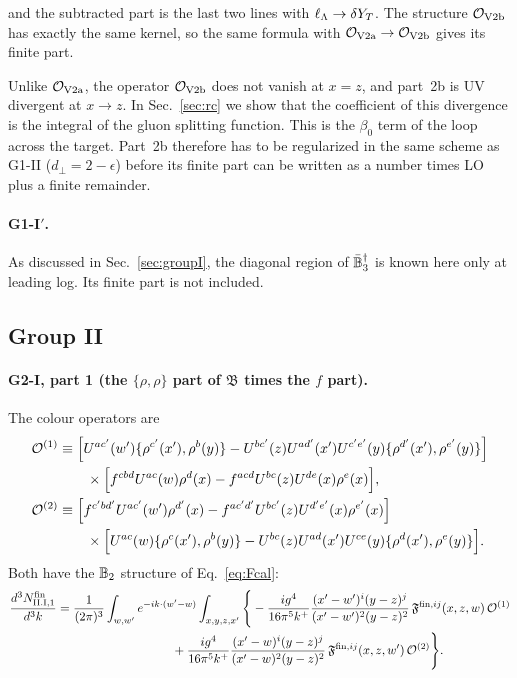 and the subtracted part is the last two lines with $\ell_{\Lambda}\to\delta Y_T$. The structure $\mathcal{O}_{\rm V2b}$ has exactly the same kernel, so the same formula with $\mathcal{O}_{\rm V2a}\to\mathcal{O}_{\rm V2b}$ gives its finite part.

Unlike $\mathcal{O}_{\rm V2a}$, the operator $\mathcal{O}_{\rm V2b}$ does not vanish at $x=z$, and part~2b is UV divergent at $x\to z$. In Sec.~\ref{sec:rc} we show that the coefficient of this divergence is the integral of the gluon splitting function. This is the $\beta_0$ term of the loop across the target. Part~2b therefore has to be regularized in the same scheme as G1-II ($d_\perp=2-\epsilon$) before its finite part can be written as a number times LO plus a finite remainder.

\paragraph*{G1-I$'$.} As discussed in Sec.~\ref{sec:groupI}, the diagonal region of $\bar{\mathbb{B}}_3^\dagger$ is known here only at leading log. Its finite part is not included.

\subsection{Group II}\label{sec:finiteG2}

\paragraph*{G2-I, part 1 (the $\{\rho,\rho\}$ part of $\mathfrak B$ times the $f$ part).} The colour operators are
\begin{align}
\mathcal{O}^{(1)}&\equiv\Big[U^{ac'}(w')\{\rho^{c'}(x'),\rho^b(y)\}-U^{bc'}(z)U^{ad'}(x')U^{c'e'}(y)\{\rho^{d'}(x'),\rho^{e'}(y)\}\Big]\notag\\
&\qquad\times\Big[f^{cbd}U^{ac}(w)\rho^d(x)-f^{acd}U^{bc}(z)U^{de}(x)\rho^e(x)\Big],\notag\\
\mathcal{O}^{(2)}&\equiv\Big[f^{c'bd'}U^{ac'}(w')\rho^{d'}(x)-f^{ac'd'}U^{bc'}(z)U^{d'e'}(x)\rho^{e'}(x)\Big]\notag\\
&\qquad\times\Big[U^{ac}(w)\{\rho^c(x'),\rho^b(y)\}-U^{bc}(z)U^{ad}(x')U^{ce}(y)\{\rho^d(x'),\rho^e(y)\}\Big].
\end{align}
Both have the $\mathbb{B}_2$ structure of Eq.~\eqref{eq:Fcal}:
\begin{align}
\frac{d^3N^{\rm fin}_{\rm II.I,1}}{d^3k}={}&\frac{1}{(2\pi)^3}\int_{w,w'}e^{-ik\cdot(w'-w)}\int_{x,y,z,x'}\Bigg\{-\frac{ig^4}{16\pi^5k^+}\frac{(x'-w')^i(y-z)^j}{(x'-w')^2(y-z)^2}\,\mathfrak F^{{\rm fin},ij}(x,z,w)\,\mathcal{O}^{(1)}\notag\\
&\hspace{8em}+\frac{ig^4}{16\pi^5k^+}\frac{(x'-w)^i(y-z)^j}{(x'-w)^2(y-z)^2}\,\mathfrak F^{{\rm fin},ij}(x,z,w')\,\mathcal{O}^{(2)}\Bigg\}.
\end{align}

